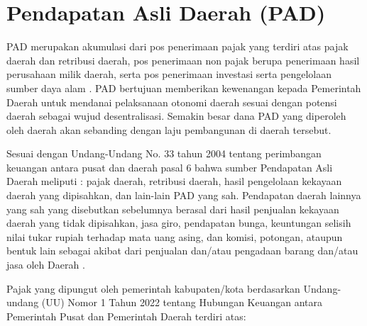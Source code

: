 \section{Pendapatan Asli Daerah (PAD)}
\label{sec:pad}

PAD merupakan akumulasi dari pos penerimaan pajak yang terdiri atas pajak daerah dan retribusi daerah, pos penerimaan non pajak berupa penerimaan hasil perusahaan milik daerah, serta pos penerimaan investasi serta pengelolaan sumber daya alam \cite{nasir2019pad}. PAD bertujuan memberikan kewenangan kepada Pemerintah Daerah untuk mendanai pelaksanaan otonomi daerah sesuai dengan potensi daerah sebagai wujud desentralisasi. Semakin besar dana PAD yang diperoleh oleh daerah akan sebanding dengan laju pembangunan di daerah tersebut. 

Sesuai dengan Undang-Undang No. 33 tahun 2004 tentang perimbangan keuangan antara pusat dan daerah pasal 6 bahwa sumber Pendapatan Asli Daerah meliputi : pajak daerah, retribusi daerah, hasil pengelolaan kekayaan daerah yang dipisahkan, dan lain-lain PAD yang sah. Pendapatan daerah lainnya yang sah yang disebutkan sebelumnya berasal dari hasil penjualan kekayaan daerah yang tidak dipisahkan, jasa giro, pendapatan bunga, keuntungan selisih nilai tukar rupiah terhadap mata uang asing, dan komisi, potongan, ataupun bentuk lain sebagai akibat dari penjualan dan/atau pengadaan barang dan/atau jasa oleh Daerah \cite{uu33_2004}. 

Pajak yang dipungut oleh pemerintah kabupaten/kota berdasarkan Undang-undang (UU) Nomor 1 Tahun 2022 tentang Hubungan Keuangan antara Pemerintah Pusat dan Pemerintah Daerah terdiri atas:

